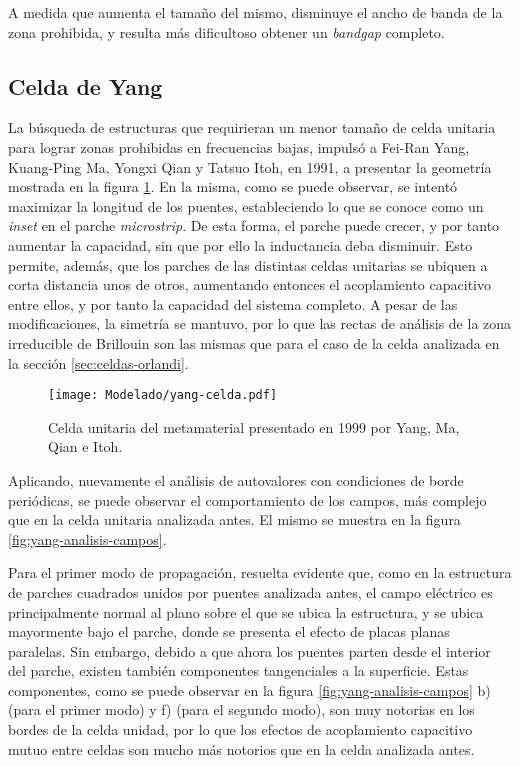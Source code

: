 A medida que aumenta el tamaño del mismo, disminuye el ancho de banda de la zona prohibida, y resulta más dificultoso obtener un \textit{bandgap} completo.

\clearpage

\subsection{Celda de Yang}
\label{sec:celda-yang}

La búsqueda de estructuras que requirieran un menor tamaño de celda unitaria para lograr zonas prohibidas en frecuencias bajas, impulsó a Fei-Ran Yang, Kuang-Ping Ma, Yongxi Qian y Tatsuo Itoh, en 1991, a presentar \cite{Yang:UCPBG} la geometría mostrada en la figura \ref{fig:celda-yang}. En la misma, como se puede observar, se intentó maximizar la longitud de los puentes, estableciendo lo que se conoce como un \textit{inset} en el parche \textit{microstrip}. De esta forma, el parche puede crecer, y por tanto aumentar la capacidad, sin que por ello la inductancia deba disminuir. Esto permite, además, que los parches de las distintas celdas unitarias se ubiquen a corta distancia unos de otros, aumentando entonces el acoplamiento capacitivo entre ellos, y por tanto la capacidad del sistema completo. A pesar de las modificaciones, la simetría se mantuvo, por lo que las rectas de análisis de la zona irreducible de Brillouin son las mismas que para el caso de la celda analizada en la sección \ref{sec:celdas-orlandi}.

\begin{figure}[h]
	\centering
	\texttt{[image: Modelado/yang-celda.pdf]}
	\caption{Celda unitaria del metamaterial presentado en 1999 por Yang, Ma, Qian e Itoh.}
	\label{fig:celda-yang}
\end{figure}

Aplicando, nuevamente el análisis de autovalores con condiciones de borde periódicas, se puede observar el comportamiento de los campos, más complejo que en la celda unitaria analizada antes. El mismo se muestra en la figura \ref{fig:yang-analisis-campos}.

Para el primer modo de propagación, resuelta evidente que, como en la estructura de parches cuadrados unidos por puentes analizada antes, el campo eléctrico es principalmente normal al plano sobre el que se ubica la estructura, y se ubica mayormente bajo el parche, donde se presenta el efecto de placas planas paralelas. Sin embargo, debido  a que ahora los puentes parten desde el interior del parche, existen también componentes tangenciales a la superficie. Estas componentes, como se puede observar en la figura \ref{fig:yang-analisis-campos} b) (para el primer modo) y f) (para el segundo modo), son muy notorias en los bordes de la celda unidad, por lo que los efectos de acoplamiento capacitivo mutuo entre celdas son mucho más notorios que en la celda analizada antes.

